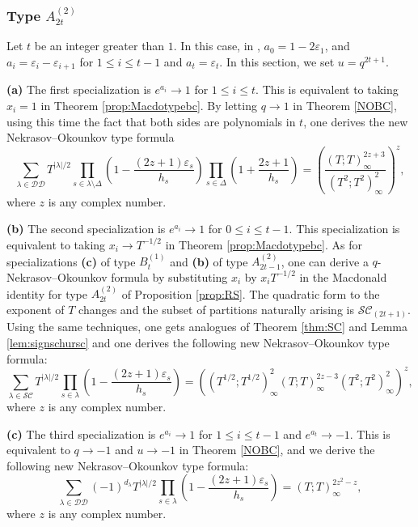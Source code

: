 \documentclass[11pt,letterpaper]{amsart}
\def\ccsc{\mathcal {SC}}
\def\ccdd{\mathcal {DD}}
\numberwithin{equation}{section}
\numberwithin{df}{section}
\begin{document}
\subsubsection{Type $A^{(2)}_{2t}$}
Let $t$ be an integer greater than $1$.
In this case, in \cite{Mac}, $a_0=1-2\varepsilon_1$, and $a_i=\varepsilon_i-\varepsilon_{i+1}$ for $1\leq i\leq t-1$ and $a_t=\varepsilon_t$. In this section, we set $u=q^{2t+1}$.

\textbf{(a)} The first specialization is $e^{a_i}\to 1$ for $1\leq i\leq t$. This is equivalent to taking $x_i=1$ in Theorem \ref{prop:Macdotypebc}.
By letting $q\rightarrow 1$ in Theorem \ref{NOBC}, using this time the fact that both sides are polynomials in $t$, one derives the new Nekrasov--Okounkov type formula
\begin{equation}\label{eq:nospecbc}
\sum_{\lambda\in\ccdd}T^{\lvert \lambda\rvert/2}\prod_{s\in\lambda\setminus\Delta}\left(1-\frac{(2z+1)\varepsilon_s}{h_s}\right)\prod_{s\in\Delta}\left(1+\frac{2z+1}{h_s}\right)=\left(\frac{\left(T;T\right)_{\infty}^{2z+3}}{\left(T^2;T^2\right)_{\infty}^{2}}\right)^{z},
\end{equation}
where $z$ is any complex number.

\textbf{(b)} The second specialization is $e^{a_i}\to 1$ for $0\leq i\leq t-1$.  This specialization is equivalent to taking $x_i\to T^{-1/2}$ in Theorem \ref{prop:Macdotypebc}. As for specializations \textbf{(c)} of type $B^{(1)}_{t}$ and \textbf{(b)} of type $A^{(2)}_{2t-1}$, one can derive a $q$-Nekrasov--Okounkov formula by substituting $x_i$ by $x_iT^{-1/2}$ in the Macdonald identity for type $A^{(2)}_{2t}$ of Proposition \ref{prop:RS}. The quadratic form to the exponent of $T$ changes and the subset of partitions naturally arising is $\ccsc_{(2t+1)}$. Using the same techniques, one gets analogues of Theorem \ref{thm:SC} and Lemma \ref{lem:signschursc} and one derives the following new Nekrasov--Okounkov type formula:
\begin{equation}\label{eq:nospecbcweird}
\sum_{\lambda\in\ccsc}T^{\lvert \lambda\rvert/2}\prod_{s\in\lambda}\left(1-\frac{(2z+1)\varepsilon_s}{h_s}\right)=\left(\left(T^{1/2};T^{1/2}\right)_{\infty}^{2}\left(T;T\right)_{\infty}^{2z-3}\left(T^{2};T^{2}\right)_{\infty}^{2}\right)^{z},
\end{equation}
where $z$ is any complex number.



\textbf{(c)} The third specialization is $e^{a_i}\to 1$ for $1\leq i\leq t-1$ and $e^{a_t}\to -1$. This is equivalent to $q\to-1$ and $u\to-1$ in Theorem \ref{NOBC}, and we derive the following new Nekrasov--Okounkov type formula:
\begin{equation}\label{eq:nospecbcmoins}
\sum_{\lambda\in\ccdd}(-1)^{d_\lambda}T^{\lvert \lambda\rvert/2}\prod_{s\in\lambda}\left(1-\frac{(2z+1)\varepsilon_s}{h_s}\right)=\left(T;T\right)_{\infty}^{2z^2-z},
\end{equation}
where $z$ is any complex number.
 
\end{document}
